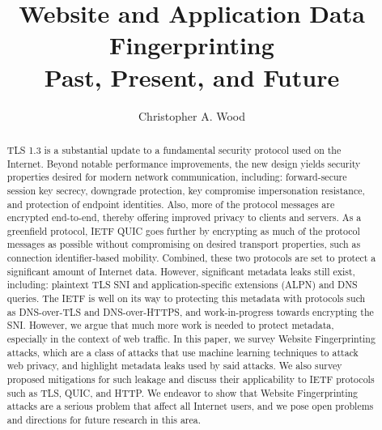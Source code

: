 \documentclass[runningheads]{llncs}
\begin{document}
\title{Website and Application Data Fingerprinting \\ Past, Present, and Future}
\author{Christopher A. Wood}

\maketitle
\begin{abstract}
TLS 1.3 is a substantial update to a fundamental security protocol used on the Internet. 
Beyond notable performance improvements, the new design yields security properties desired
for modern network communication, including: forward-secure session key secrecy, downgrade
protection, key compromise impersonation resistance, and protection of endpoint identities. 
Also, more of the protocol messages are encrypted end-to-end, thereby offering improved
privacy to clients and servers. As a greenfield protocol, IETF QUIC goes further by encrypting
as much of the protocol messages as possible without compromising on desired transport
properties, such as connection identifier-based mobility. Combined, these two protocols 
are set to protect a significant amount of Internet data. However, significant metadata leaks still exist,
including: plaintext TLS SNI and application-specific extensions (ALPN) and DNS queries.
The IETF is well on its way to protecting this metadata with protocols such as DNS-over-TLS 
and DNS-over-HTTPS, and work-in-progress towards encrypting the SNI. However, we argue that
much more work is needed to protect metadata, especially in the context of web traffic. 
In this paper, we survey Website Fingerprinting attacks, which are a class of attacks that
use machine learning techniques to attack web privacy, and highlight metadata leaks used
by said attacks. We also survey proposed mitigations for such leakage and discuss their 
applicability to IETF protocols such as TLS, QUIC, and HTTP. We endeavor to show that
Website Fingerprinting attacks are a serious problem that affect all Internet users, 
and we pose open problems and directions for future research in this area.

\end{abstract}
\end{document}

